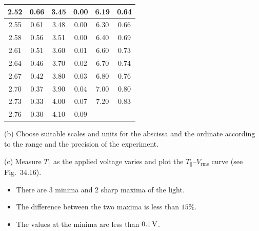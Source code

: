 \begin{center}
{\begin{tabular}{|c|c||c|c||c|c|}
\hline
2.52 & 0.66 & 3.45 & 0.00 & 6.19 & 0.64\\
\hline
2.55 & 0.61 & 3.48 & 0.00 & 6.30 & 0.66\\
\hline
2.58 & 0.56 & 3.51 & 0.00 & 6.40 & 0.69\\
\hline
2.61 & 0.51 & 3.60 & 0.01 & 6.60 & 0.73\\
\hline
2.64 & 0.46 & 3.70 & 0.02 & 6.70 & 0.74\\
\hline
2.67 & 0.42 & 3.80 & 0.03 & 6.80 & 0.76\\
\hline
2.70 & 0.37 & 3.90 & 0.04 & 7.00 & 0.80\\
\hline
2.73 & 0.33 & 4.00 & 0.07 & 7.20 & 0.83\\
\hline
2.76 & 0.30 & 4.10 & 0.09 & & \\
\hline
\end{tabular}}
\end{center}

(b) Choose suitable scales and units for the abscissa and the ordinate according to the range
and the precision of the experiment.

(c) Measure $T_{\parallel}$ as the applied voltage varies and plot the
$T_{\parallel}$--$V_{\mathrm{rms}}$ curve (see Fig.~34.16).

\begin{itemize}
\item There are 3 minima and 2 sharp maxima of the light.
\item The difference between the two maxima is less than $15\%$.
\item The values at the minima are less than $0.1\,\mathrm{V}$.
\end{itemize}

